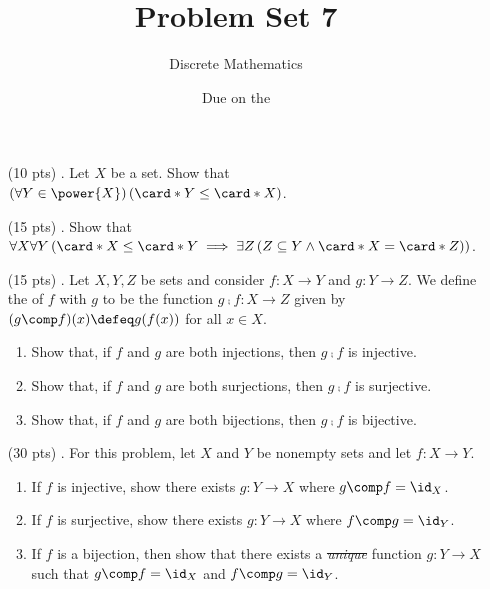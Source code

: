 
% 
% 
% 

\title{Problem Set 7}
\author[Daniel Gonzalez Cedre]{Discrete Mathematics}
\date{Due on the }



\maketitle

\begin{enumerate}
  \item[(10 pts) \quad 1.]
    Let $X$ be a set.
    Show that $\left(\forall Y \in \power{X}\right)\left(\card*{Y} \leq \card*{X}\right)$.

  \item[(15 pts) \quad 2.]
    Show that $\forall X \forall Y \left(\card*{X} \leq  \card*{Y} \implies \exists Z \left(Z \subseteq Y \land \card*{X} = \card*{Z}\right)\right)$.

  \item[(15 pts) \quad 3.]
    Let $X, Y, Z$ be sets and consider
    $f: X \to Y$ and $g: Y \to Z$.%
    We define the  of $f$ with $g$ to be the function
    $g \comp f: X \to Z$ given by
    $(g \comp f)(x) \defeq g(f(x))$
    for all $x \in X$.
    \begin{enumerate}
      \item
        Show that, if $f$ and $g$ are both injections, then $g \comp f$ is injective.%
      \item
        Show that, if $f$ and $g$ are both surjections, then $g \comp f$ is surjective.%
      \item
        Show that, if $f$ and $g$ are both bijections, then $g \comp f$ is bijective.
    \end{enumerate}

  \item[(30 pts) \quad 4.]
    For this problem, let $X$ and $Y$ be nonempty sets and let $f: X \to Y$.
    \begin{enumerate}
      \item
        If $f$ is injective, show there exists $g: Y \to X$ where $g \comp f = \id_X$.
      \item
        If $f$ is surjective, show there exists $g: Y \to X$ where $f \comp g = \id_Y$.
      \item
        If $f$ is a bijection, then show that there exists a \sout{\emph{unique}} function $g: Y \to X$ such that $g \comp f = \id_X$ and $f \comp g = \id_Y$.
    \end{enumerate}


\end{enumerate}
